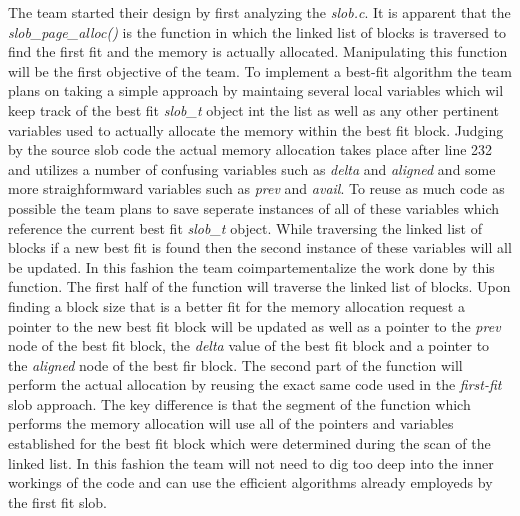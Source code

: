 \documentclass[10pt,onecolumn,draftclsnofoot]{IEEEtran} %
\begin{document}
\begin{singlespace}
  \normalfont \indent The team started their design by first analyzing the \textit{slob.c}. It is apparent that the \textit{slob\_page\_alloc()} is the function in which the linked list of blocks is traversed to find the first fit and the memory is actually allocated. Manipulating this function will be the first objective of the team. To implement a best-fit algorithm the team plans on taking a simple approach by maintaing several local variables which wil keep track of the best fit \textit{slob\_t} object int the list as well as any other pertinent variables used to actually allocate the memory within the best fit block. Judging by the source slob code the actual memory allocation takes place after line 232 and utilizes a number of confusing variables such as \textit{delta} and \textit{aligned} and some more straighformward variables such as \textit{prev} and \textit{avail}. To reuse as much code as possible the team plans to save seperate instances of all of these variables which reference the current best fit \textit{slob\_t} object. While traversing the linked list of blocks if a new best fit is found then the second instance of these variables will all be updated. In this fashion the team coimpartementalize the work done by this function. The first half of the function will traverse the linked list of blocks. Upon finding a block size that is a better fit for the memory allocation request a pointer to the new best fit block will be updated as well as a pointer to the \textit{prev} node of the best fit block, the \textit{delta} value of the best fit block and a pointer to the \textit{aligned} node of the best fir block. The second part of the function will perform the actual allocation by reusing the exact same code used in the \textit{first-fit} slob approach. The key difference is that the segment of the function which performs the memory allocation will use all of the  pointers and variables established for the best fit block which were determined during the scan of the linked list. In this fashion the team will not need to dig too deep into the inner workings of the code and can use the efficient algorithms already employeds by the first fit slob.   


\end{singlespace}
\end{document}
